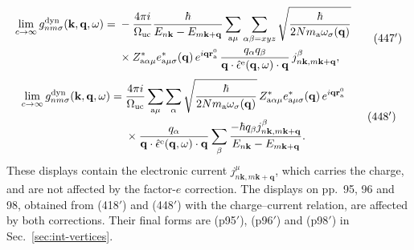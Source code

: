 \documentclass[11pt]{article}
\begin{document}
\begin{equation*}
\begin{split}
\lim_{c\to\infty}g^{\rm dyn}_{nm\sigma}(\mathbf k,\mathbf q,\omega)={}&-\frac{4\pi i}{\Omega_{\rm uc}}
\frac{\hbar}{E_{n\mathbf k}-E_{m\mathbf k+\mathbf q}}\sum_{{\rm a}\mu}\sum_{\alpha\beta=xyz}
\sqrt{\frac{\hbar}{2Nm_{\rm a}\omega_\sigma(\mathbf q)}}\\
&\times Z^*_{{\rm a}\alpha\mu}e^*_{{\rm a}\mu\sigma}(\mathbf q)\,e^{i\mathbf q\mathbf r^0_{\rm a}}\,
\frac{q_\alpha q_\beta}{\mathbf q\cdot\hat\epsilon^{\rm e}(\mathbf q,\omega)\cdot\mathbf q}\,
j^\beta_{n\mathbf k,m\mathbf k+\mathbf q},
\end{split}
\tag{447$'$}
\end{equation*}
\begin{equation*}
\begin{split}
\lim_{c\to\infty}g^{\rm dyn}_{nm\sigma}(\mathbf k,\mathbf q,\omega)={}&\frac{4\pi i}{\Omega_{\rm uc}}
\sum_{{\rm a}\mu}\sum_\alpha\sqrt{\frac{\hbar}{2Nm_{\rm a}\omega_\sigma(\mathbf q)}}\,
Z^*_{{\rm a}\alpha\mu}e^*_{{\rm a}\mu\sigma}(\mathbf q)\,e^{i\mathbf q\mathbf r^0_{\rm a}}\\
&\times\frac{q_\alpha}{\mathbf q\cdot\hat\epsilon^{\rm e}(\mathbf q,\omega)\cdot\mathbf q}\sum_\beta\frac{-\hbar q_\beta j^\beta_{n\mathbf k,m\mathbf k+\mathbf q}}{E_{n\mathbf k}-E_{m\mathbf k+\mathbf q}}.
\end{split}
\tag{448$'$}
\end{equation*}
These displays contain the electronic current $j^\mu_{n\mathbf k,m\mathbf k+\mathbf q}$, which carries the
charge, and are not affected by the factor-$e$ correction. The displays on pp.~95, 96 and 98, obtained
from (418$'$) and (448$'$) with the charge--current relation, are affected by both corrections. Their
final forms are (p95$'$), (p96$'$) and (p98$'$) in Sec.~\ref{sec:int-vertices}.
\end{document}
